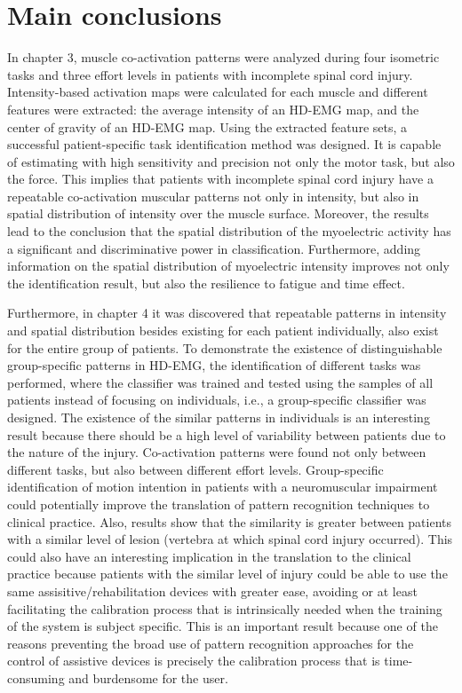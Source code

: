 \section{Main conclusions}

In chapter 3, muscle co-activation patterns were analyzed during four isometric tasks and three effort levels in patients with incomplete spinal cord injury. Intensity-based activation maps were calculated for each muscle and different features were extracted: the average intensity of an HD-EMG map, and the center of gravity of an HD-EMG map. Using the extracted feature sets, a successful patient-specific task identification method was designed. It is capable of estimating with high sensitivity and precision not only the motor task, but also the force. This implies that patients with incomplete spinal cord injury have a repeatable co-activation muscular patterns not only in intensity, but also in spatial distribution of intensity over the muscle surface. Moreover, the results lead to the conclusion that the spatial distribution of the myoelectric activity has a significant and discriminative power in classification. Furthermore, adding information on the spatial distribution of myoelectric intensity improves not only the identification result, but also the resilience to fatigue and time effect.

Furthermore, in chapter 4 it was discovered that repeatable patterns in intensity and spatial distribution besides existing for each patient individually, also exist for the entire group of patients. To demonstrate the existence of distinguishable group-specific patterns in HD-EMG, the identification of different tasks was performed, where the classifier was trained and tested using the samples of all patients instead of focusing on individuals, i.e., a group-specific classifier was designed. The existence of the similar patterns in individuals is an interesting result because there should be a high level of variability between patients due to the nature of the injury. Co-activation patterns were found not only between different tasks, but also between different effort levels. Group-specific identification of motion intention in patients with a neuromuscular impairment could potentially improve the translation of pattern recognition techniques to clinical practice. Also, results show that the similarity is greater between patients with a similar level of lesion (vertebra at which spinal cord injury occurred). This could also have an interesting implication in the translation to the clinical practice because patients with the similar level of injury could be able to use the same assisitive/rehabilitation devices with greater ease, avoiding or at least facilitating the calibration process that is intrinsically needed when the training of the system is subject specific. This is an important result because one of the reasons preventing the broad use of pattern recognition approaches for the control of assistive devices is precisely the calibration process that is time-consuming and burdensome for the user.

